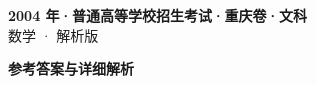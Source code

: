 \documentclass[zihao=-4, a4paper]{ctexart}
\begin{document}
\begin{center}
  {\Large\bfseries 2004 年·普通高等学校招生考试·重庆卷·文科}\\[4pt]
  {\large 数学 · 解析版}
\end{center}
\medskip
{}

\clearpage
{}
\begin{center}{\Large\bfseries 参考答案与详细解析}\end{center}
\medskip

\end{document}
